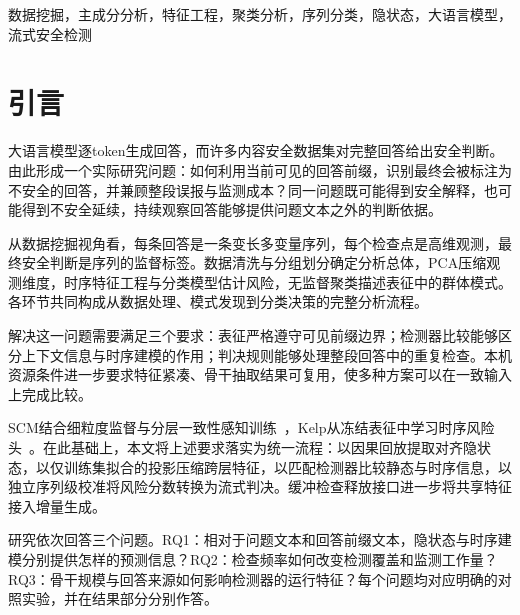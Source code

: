 \begin{abstract}
高维隐状态流为挖掘大语言模型回答中逐步演化的安全风险提供了数据基础。本文构建覆盖数据清洗、降维、特征工程、序列分类与聚类分析的可复现流程。采用仅在训练集拟合的增量主成分分析（PCA）压缩冻结Qwen2.5的多层隐状态，利用状态差分与几何变化刻画前缀演化；以词频—逆文档频率（TF--IDF）和线性探针构建文本与表征基线，以门控循环单元（GRU）建模特征序列。通过独立序列级校准形成流式判决，并利用K均值分析回答表征的群体结构。\ReviewRankingZH{} \AbstractResultsZH{} 静态与时序检测器呈现不同的召回率—误报率运行特征。共享特征缓存与缓冲检查释放接口进一步连接离线数据挖掘与增量运行，形成适用于本机资源条件的内容安全数据分析框架。
\end{abstract}
\begin{IEEEkeywords}
数据挖掘，主成分分析，特征工程，聚类分析，序列分类，隐状态，大语言模型，流式安全检测
\end{IEEEkeywords}

\section{引言}
大语言模型逐token生成回答，而许多内容安全数据集对完整回答给出安全判断。由此形成一个实际研究问题：如何利用当前可见的回答前缀，识别最终会被标注为不安全的回答，并兼顾整段误报与监测成本？同一问题既可能得到安全解释，也可能得到不安全延续，持续观察回答能够提供问题文本之外的判断依据。

从数据挖掘视角看，每条回答是一条变长多变量序列，每个检查点是高维观测，最终安全判断是序列的监督标签。数据清洗与分组划分确定分析总体，PCA压缩观测维度，时序特征工程与分类模型估计风险，无监督聚类描述表征中的群体模式。各环节共同构成从数据处理、模式发现到分类决策的完整分析流程。

解决这一问题需要满足三个要求：表征严格遵守可见前缀边界；检测器比较能够区分上下文信息与时序建模的作用；判决规则能够处理整段回答中的重复检查。本机资源条件进一步要求特征紧凑、骨干抽取结果可复用，使多种方案可以在一致输入上完成比较。

SCM结合细粒度监督与分层一致性感知训练~\cite{NEURIPS2025_4e315702}，Kelp从冻结表征中学习时序风险头~\cite{li2025kelpstreamingsafeguardlarge}。在此基础上，本文将上述要求落实为统一流程：以因果回放提取对齐隐状态，以仅训练集拟合的投影压缩跨层特征，以匹配检测器比较静态与时序信息，以独立序列级校准将风险分数转换为流式判决。缓冲检查释放接口进一步将共享特征接入增量生成。

研究依次回答三个问题。RQ1：相对于问题文本和回答前缀文本，隐状态与时序建模分别提供怎样的预测信息？RQ2：检查频率如何改变检测覆盖和监测工作量？RQ3：骨干规模与回答来源如何影响检测器的运行特征？每个问题均对应明确的对照实验，并在结果部分分别作答。

